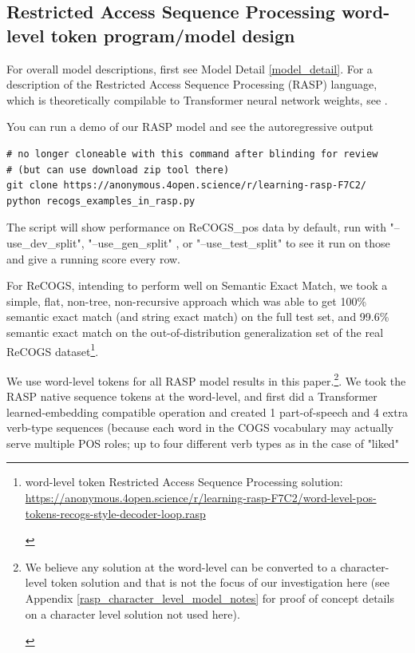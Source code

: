 \documentclass[11pt]{article}
\begin{document}
\twocolumn
\clearpage

\subsection{Restricted Access Sequence Processing word-level token program/model design}
\label{rasp-word-level-model-design}

For overall model descriptions, first see Model Detail \ref{model_detail}.
For a description of the Restricted Access Sequence Processing (RASP) language, which is theoretically compilable to Transformer neural network weights, see \cite{Weiss2021}.

You can run a demo of our RASP model and see the autoregressive output 

\begin{tiny}
\begin{verbatim}
# no longer cloneable with this command after blinding for review
# (but can use download zip tool there)
git clone https://anonymous.4open.science/r/learning-rasp-F7C2/
python recogs_examples_in_rasp.py 
\end{verbatim}
\end{tiny}

The script will show performance on \cite{Wu2023} ReCOGS\_pos data by default, run with "--use\_dev\_split", "--use\_gen\_split" , or "--use\_test\_split" to see it run on those and give a running score every row.

For ReCOGS, intending to perform well on Semantic Exact Match, we took a simple, flat, non-tree, non-recursive approach which was able to get 100\% semantic exact match (and string exact match) on the full test set, and 99.6\% semantic exact match on the out-of-distribution generalization set of the real ReCOGS dataset\footnote{\begin{footnotesize}word-level token Restricted Access Sequence Processing solution: \href{https://anonymous.4open.science/r/learning-rasp-F7C2/word-level-pos-tokens-recogs-style-decoder-loop.rasp}{https://anonymous.4open.science/r/learning-rasp-F7C2/word-level-pos-tokens-recogs-style-decoder-loop.rasp} \end{footnotesize}}.

We use word-level tokens for all RASP model results in this paper.\footnote{\begin{footnotesize}We believe any solution at the word-level can be converted to a character-level token solution and that is not the focus of our investigation here (see Appendix \ref{rasp_character_level_model_notes} for proof of concept details on a character level solution not used here).\end{footnotesize}}. We took the RASP native sequence tokens at the word-level, and first did a Transformer learned-embedding compatible operation and created 1 part-of-speech and 4 extra verb-type sequences (because each word in the COGS vocabulary may actually serve multiple POS roles; up to four different verb types as in the case of "liked" 
\end{document}
